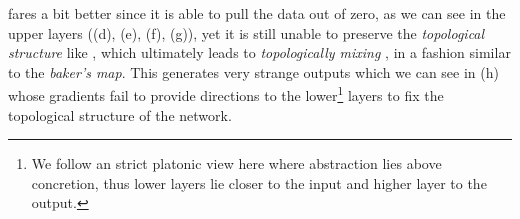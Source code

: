 \begin{figure}
{{    %
    }
    \parbox{.195\textwidth}{%
    }
  }
  \caption{\ReLUBN}
    \label{fig:moonsReLUBN}
\end{figure}

\ReLUBN fares a bit better since it is able to pull the data out of zero, as we can see in the upper layers ((d), (e), (f), (g)), yet it is still unable to preserve the \emph{topological structure} like \ReLU, which ultimately leads to \emph{topologically mixing} \cite{hirsch2012differential}, in a fashion similar to the \emph{baker's map}. This generates very strange outputs which we can see in (h) whose gradients fail to provide directions to the lower\footnote{We follow an strict platonic view here where abstraction lies above concretion, thus lower layers lie closer to the input and higher layer to the output.} layers to fix the topological structure of the network. 


